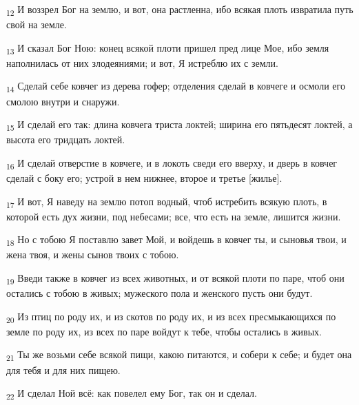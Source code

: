 \begin{tcolorbox}
\textsubscript{12} И воззрел Бог на землю, и вот, она растленна, ибо всякая плоть извратила путь свой на земле.
\end{tcolorbox}
\begin{tcolorbox}
\textsubscript{13} И сказал Бог Ною: конец всякой плоти пришел пред лице Мое, ибо земля наполнилась от них злодеяниями; и вот, Я истреблю их с земли.
\end{tcolorbox}
\begin{tcolorbox}
\textsubscript{14} Сделай себе ковчег из дерева гофер; отделения сделай в ковчеге и осмоли его смолою внутри и снаружи.
\end{tcolorbox}
\begin{tcolorbox}
\textsubscript{15} И сделай его так: длина ковчега триста локтей; ширина его пятьдесят локтей, а высота его тридцать локтей.
\end{tcolorbox}
\begin{tcolorbox}
\textsubscript{16} И сделай отверстие в ковчеге, и в локоть сведи его вверху, и дверь в ковчег сделай с боку его; устрой в нем нижнее, второе и третье [жилье].
\end{tcolorbox}
\begin{tcolorbox}
\textsubscript{17} И вот, Я наведу на землю потоп водный, чтоб истребить всякую плоть, в которой есть дух жизни, под небесами; все, что есть на земле, лишится жизни.
\end{tcolorbox}
\begin{tcolorbox}
\textsubscript{18} Но с тобою Я поставлю завет Мой, и войдешь в ковчег ты, и сыновья твои, и жена твоя, и жены сынов твоих с тобою.
\end{tcolorbox}
\begin{tcolorbox}
\textsubscript{19} Введи также в ковчег из всех животных, и от всякой плоти по паре, чтоб они остались с тобою в живых; мужеского пола и женского пусть они будут.
\end{tcolorbox}
\begin{tcolorbox}
\textsubscript{20} Из птиц по роду их, и из скотов по роду их, и из всех пресмыкающихся по земле по роду их, из всех по паре войдут к тебе, чтобы остались в живых.
\end{tcolorbox}
\begin{tcolorbox}
\textsubscript{21} Ты же возьми себе всякой пищи, какою питаются, и собери к себе; и будет она для тебя и для них пищею.
\end{tcolorbox}
\begin{tcolorbox}
\textsubscript{22} И сделал Ной всё: как повелел ему Бог, так он и сделал.
\end{tcolorbox}
